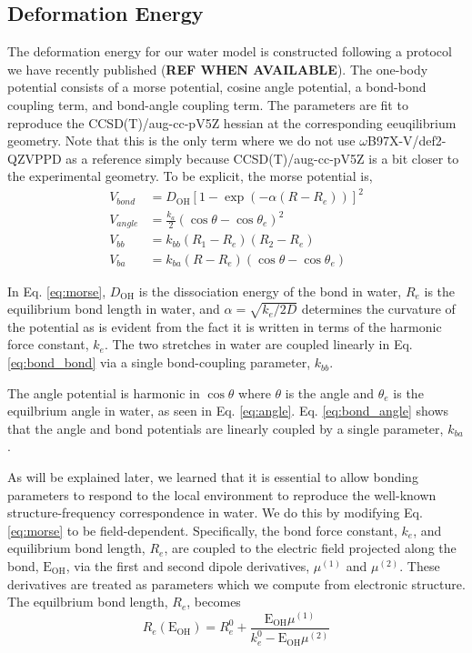 \documentclass[journal=jacsat,manuscript=article]{achemso}
\begin{document}
\subsection*{Deformation Energy}

The deformation energy for our water model is constructed following a protocol we have recently published (\textbf{REF WHEN AVAILABLE}). The one-body potential consists of a morse potential, cosine angle potential, a bond-bond coupling term, and bond-angle coupling term. The parameters are fit to reproduce the CCSD(T)/aug-cc-pV5Z hessian at the corresponding eeuqilibrium geometry. Note that this is the only term where we do not use $\omega$B97X-V/def2-QZVPPD as a reference simply because CCSD(T)/aug-cc-pV5Z is a bit closer to the experimental geometry. To be explicit, the morse potential is,
\begin{align}
  \label{eq:morse}
  V_{bond}&=D_{\mathrm{OH}}\left[ 1-\exp(-\alpha (R-R_e))\right]^2 \\
  \label{eq:angle}
  V_{angle}&=\frac{k_a}{2}(\cos\theta-\cos\theta_e)^2 \\
  \label{eq:bond_bond}
  V_{bb}&=k_{bb}(R_1-R_e)(R_2-R_e) \\
  \label{eq:bond_angle}
  V_{ba}&=k_{ba}(R-R_e)(\cos\theta-\cos\theta_e)
\end{align}

In Eq. \ref{eq:morse}, $D_{\mathrm{OH}}$ is the dissociation energy of the  bond in water, $R_e$ is the equilibrium bond length in water, and $\alpha=\sqrt{k_e/2D}$ determines the curvature of the potential as is evident from the fact it is written in terms of the harmonic force constant, $k_e$. The two  stretches in water are coupled linearly in Eq. \ref{eq:bond_bond} via a single bond-coupling parameter, $k_{bb}$.

The angle potential is harmonic in $\cos\theta$ where $\theta$ is the  angle and $\theta_e$ is the equilbrium angle in water, as seen in Eq. \ref{eq:angle}. Eq. \ref{eq:bond_angle} shows that the angle and bond potentials are linearly coupled by a single parameter, $k_{ba}$.

As will be explained later, we learned that it is essential to allow bonding parameters to respond to the local environment to reproduce the well-known structure-frequency correspondence in water.\cite{boyer2019beyond} We do this by modifying Eq. \ref{eq:morse} to be field-dependent. Specifically, the bond force constant, $k_e$, and equilibrium bond length, $R_e$, are coupled to the electric field projected along the bond, $\mathrm{E_{OH}}$, via the first and second dipole derivatives, $\mu^{(1)}$ and $\mu^{(2)}$. These derivatives are treated as parameters which we compute from electronic structure. The equilbrium bond length, $R_e$, becomes
\begin{equation}
  R_e(\mathrm{E_{OH}})=R_e^0+ \frac{\mathrm{E_{OH}}\mu^{(1)}}{k_e^0-\mathrm{E_{OH}}\mu^{(2)}}
  \label{eq:bond_in_field}
\end{equation}
\end{document}
